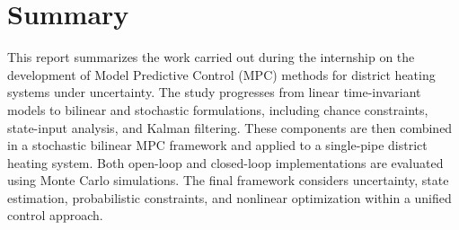 \chapter{Summary}
This report summarizes the work carried out during the internship on the development of Model Predictive Control (MPC) methods for district heating systems under uncertainty. The study progresses from linear time-invariant models to bilinear and stochastic formulations, including chance constraints, state-input analysis, and Kalman filtering. These components are then combined in a stochastic bilinear MPC framework and applied to a single-pipe district heating system. Both open-loop and closed-loop implementations are evaluated using Monte Carlo simulations. The final framework considers uncertainty, state estimation, probabilistic constraints, and nonlinear optimization within a unified control approach.
